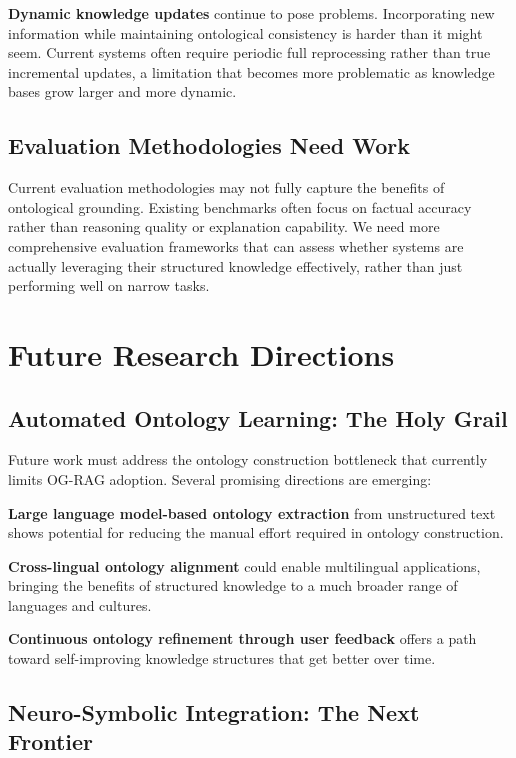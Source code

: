 \textbf{Dynamic knowledge updates} continue to pose problems. Incorporating new information while maintaining ontological consistency is harder than it might seem. Current systems often require periodic full reprocessing rather than true incremental updates, a limitation that becomes more problematic as knowledge bases grow larger and more dynamic.

\subsection{Evaluation Methodologies Need Work}

Current evaluation methodologies may not fully capture the benefits of ontological grounding. Existing benchmarks often focus on factual accuracy rather than reasoning quality or explanation capability. We need more comprehensive evaluation frameworks that can assess whether systems are actually leveraging their structured knowledge effectively, rather than just performing well on narrow tasks.

\section{Future Research Directions}

\subsection{Automated Ontology Learning: The Holy Grail}

Future work must address the ontology construction bottleneck that currently limits OG-RAG adoption. Several promising directions are emerging:

\textbf{Large language model-based ontology extraction} from unstructured text shows potential for reducing the manual effort required in ontology construction.

\textbf{Cross-lingual ontology alignment} could enable multilingual applications, bringing the benefits of structured knowledge to a much broader range of languages and cultures.

\textbf{Continuous ontology refinement through user feedback} offers a path toward self-improving knowledge structures that get better over time.

\subsection{Neuro-Symbolic Integration: The Next Frontier}

